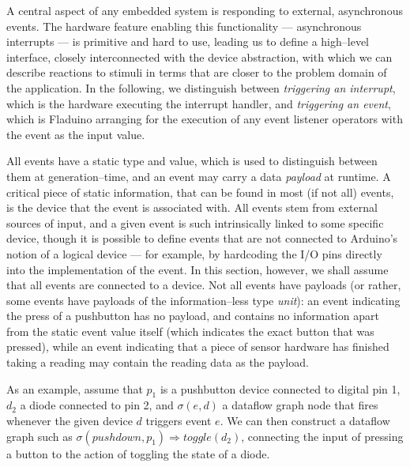 \documentclass[a4paper, oneside, final]{memoir}
\begin{document}
A central aspect of any embedded system is responding to external,
asynchronous events.  The hardware feature enabling this functionality
--- asynchronous interrupts --- is primitive and hard to use, leading
us to define a high--level interface, closely interconnected with the
device abstraction, with which we can describe reactions to stimuli in
terms that are closer to the problem domain of the application.  In
the following, we distinguish between \textit{triggering an
  interrupt}, which is the hardware executing the interrupt handler,
and \textit{triggering an event}, which is Fladuino arranging for the
execution of any event listener operators with the event as the input
value.

All events have a static type and value, which is used to distinguish
between them at generation--time, and an event may carry a data
\textit{payload} at runtime.  A critical piece of static information,
that can be found in most (if not all) events, is the device that the
event is associated with.  All events stem from external sources of
input, and a given event is such intrinsically linked to some specific
device, though it is possible to define events that are not connected
to Arduino's notion of a logical device --- for example, by hardcoding
the I/O pins directly into the implementation of the event.  In this
section, however, we shall assume that all events are connected to a
device.  Not all events have payloads (or rather, some events have
payloads of the information--less type \textit{unit}): an event
indicating the press of a pushbutton has no payload, and contains no
information apart from the static event value itself (which indicates
the exact button that was pressed), while an event indicating that a
piece of sensor hardware has finished taking a reading may contain the
reading data as the payload.

As an example, assume that $p_1$ is a pushbutton device connected to
digital pin 1, $d_2$ a diode connected to pin 2, and $\sigma(e,d)$ a
dataflow graph node that fires whenever the given device $d$ triggers
event $e$.  We can then construct a dataflow graph such as
$\sigma(pushdown,p_1) \Rightarrow toggle(d_2)$, connecting the input
of pressing a button to the action of toggling the state of a diode.
\end{document}
